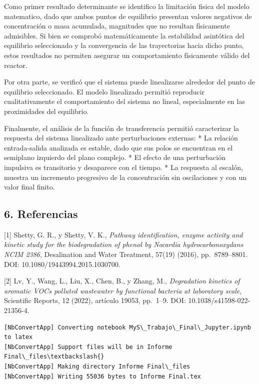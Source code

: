 \documentclass[11pt]{article}
\begin{document}
Como primer resultado determinante se identifico la limitación fisica
del modelo matematico, dado que ambos puntos de equilibrio presentan
valores negativos de concentración o masa acumulada, magnitudes que no
resultan físicamente admisibles. Si bien se comprobó matemáticamente la
estabilidad asintótica del equilibrio seleccionado y la convergencia de
las trayectorias hacia dicho punto, estos resultados no permiten
asegurar un comportamiento físicamente válido del reactor.

Por otra parte, se verificó que el sistema puede linealizarse alrededor
del punto de equilibrio seleccionado. El modelo linealizado permitió
reproducir cualitativamente el comportamiento del sistema no lineal,
especialmente en las proximidades del equilibrio.

Finalmente, el análisis de la función de transferencia permitió
caracterizar la respuesta del sistema linealizado ante perturbaciones
externas: * La relación entrada-salida analizada es estable, dado que
sus polos se encuentran en el semiplano izquierdo del plano complejo. *
El efecto de una perturbación impulsiva es transitorio y desaparece con
el tiempo. * La respuesta al escalón, muestra un incremento progresivo
de la concentración sin oscilaciones y con un valor final finito.

    \subsection{6. Referencias}\label{referencias}

{[}1{]} Shetty, G. R., y Shetty, V. K., \emph{Pathway identification,
enzyme activity and kinetic study for the biodegradation of phenol by
Nocardia hydrocarbonoxydans NCIM 2386}, Desalination and Water
Treatment, 57(19) (2016), pp.~8789--8801. DOI:
10.1080/19443994.2015.1030700.

{[}2{]} Lv, Y., Wang, L., Liu, X., Chen, B., y Zhang, M.,
\emph{Degradation kinetics of aromatic VOCs polluted wastewater by
functional bacteria at laboratory scale}, Scientific Reports, 12 (2022),
artículo 19053, pp.~1--9. DOI: 10.1038/s41598-022-21356-4.

    \begin{Verbatim}[commandchars=\\\{\}]
[NbConvertApp] Converting notebook MyS\_Trabajo\_Final\_Jupyter.ipynb to latex
[NbConvertApp] Support files will be in Informe Final\_files\textbackslash{}
[NbConvertApp] Making directory Informe Final\_files
[NbConvertApp] Writing 55036 bytes to Informe Final.tex
    \end{Verbatim}


    
    
    
\end{document}
